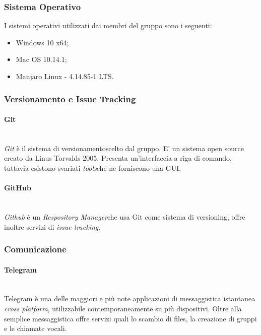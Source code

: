 \subsubsection{Sistema Operativo}
	I sistemi operativi utilizzati dai membri del gruppo sono i seguenti:
	\begin{itemize}
	\item Windows 10 x64;
	\item Mac OS 10.14.1;
	\item Manjaro Linux - 4.14.85-1 LTS.
	\end{itemize}

\subsubsection{Versionamento e Issue Tracking}

\paragraph{Git} ~\\
	\textit{Git} è il sistema di versionamento\glossario scelto dal gruppo. E' un sistema open source creato da Linus 	Torvalds 2005. Presenta un'interfaccia a riga di comando, tuttavia esistono svariati \textit{tools}\glossario 	che 	ne forniscono una GUI.

\paragraph{GitHub} ~\\
	\textit{Github} è un \textit{Respository Manager}\glossario che usa Git come sistema di versioning, offre inoltre 	servizi di \textit{issue tracking}\glossario.

\subsubsection{Comunicazione}

\paragraph{Telegram} ~\\
	Telegram è una delle maggiori e più note applicazioni di messaggistica istantanea \textit{cross platform}, 					utilizzabile contemporaneamente su più dispositivi. Oltre alla semplice messaggistica offre servizi quali lo 				scambio di files, la creazione di gruppi e le chiamate vocali.

